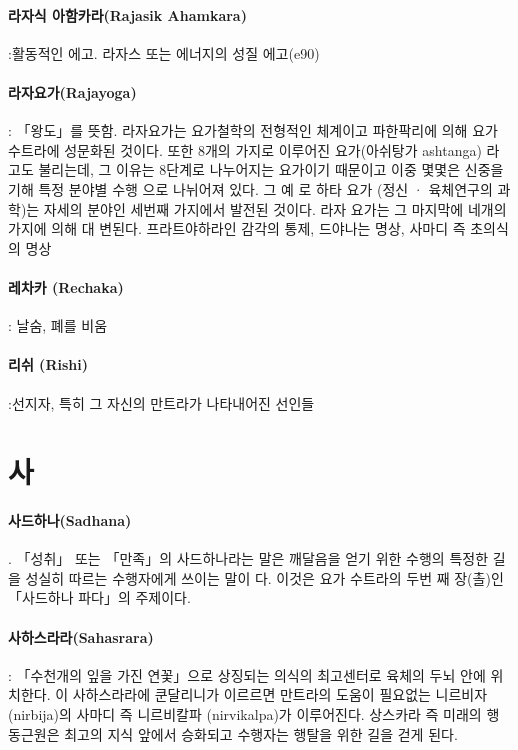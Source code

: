 \documentclass[12pt, a4paper, oneside]{book}
\let\stdsection\section
\renewcommand\section{\newpage\stdsection}
\begin{document}
\paragraph{라자식 아함카라(Rajasik Ahamkara)} :활동적인 에고. 라자스 또는 에너지의 성질 에고(e90)

\paragraph{라자요가(Rajayoga)} : 「왕도」를 뜻함. 라자요가는 요가철학의 전형적인 체계이고 파한팍리에 의해 요가 수트라에 성문화된 것이다. 또한 8개의 가지로 이루어진 요가(아쉬탕가 ashtanga) 라고도 불리는데, 그 이유는 8단계로 나누어지는 요가이기 때문이고 이중 몇몇은 신중을 기해 특정 분야별 수행 으로 나뉘어져 있다. 그 예 로 하타 요가 (정신 · 육체연구의 과학)는 자세의 분야인 세번째 가지에서 발전된 것이다. 라자 요가는 그 마지막에 네개의 가지에 의해 대 변된다. 프라트야하라인 감각의 통제, 드야나는 명상, 사마디 즉 초의식의 명상

\paragraph{레차카 (Rechaka)} : 날숨, 폐를 비움

\paragraph{리쉬 (Rishi)} :선지자, 특히 그 자신의 만트라가 나타내어진  선인들


\newpage
\section{사}

\paragraph{사드하나(Sadhana)} . 「성취」 또는 「만족」의 사드하나라는 말은 깨달음을 얻기 위한 수행의 특정한 길을 성실히 따르는 수행자에게 쓰이는 말이 다. 이것은 요가 수트라의 두번 째 장(촐)인 「사드하나 파다」의 주제이다.

\paragraph{사하스라라(Sahasrara)} : 「수천개의 잎을 가진 연꽃」으로 상징되는 의식의 최고센터로 육체의 두뇌 안에 위치한다. 이 사하스라라에 쿤달리니가 이르르면 만트라의 도움이 필요없는 니르비자(nirbija)의 사마디 즉 니르비칼파 (nirvikalpa)가 이루어진다. 상스카라 즉 미래의 행동근원은 최고의 지식 앞에서 승화되고 수행자는 행탈을 위한 길을 걷게 된다.
\end{document}
